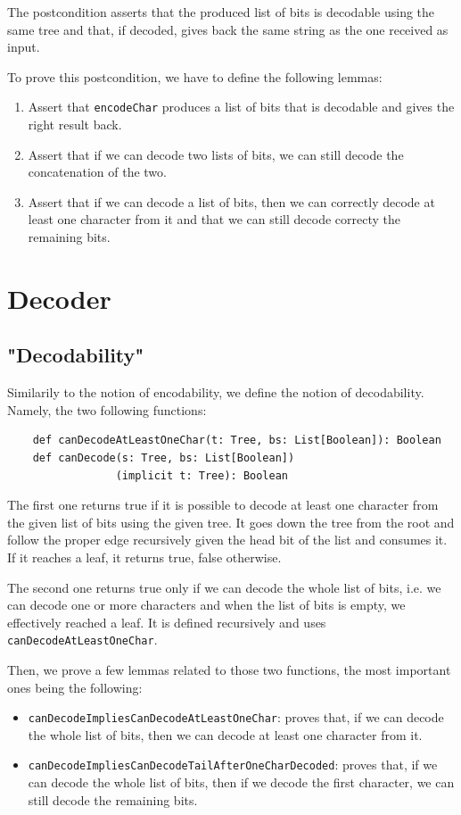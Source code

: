 \documentclass[a4paper,UKenglish,cleveref, autoref, thm-restate]{lipics-v2021}
\begin{document}
The postcondition asserts that the produced list of bits is decodable using the same tree and that, if decoded, gives back the same string as the one received as input.

To prove this postcondition, we have to define the following lemmas:
\begin{enumerate}
    \item Assert that \lstinline{encodeChar} produces a list of bits that is decodable and gives the right result back.
    \item Assert that if we can decode two lists of bits, we can still decode the concatenation of the two.
    \item Assert that if we can decode a list of bits, then we can correctly decode at least one character from it and that we can still decode correcty the remaining bits.
\end{enumerate}

\section{Decoder}

\subsection{"Decodability"}
Similarily to the notion of encodability, we define the notion of decodability. Namely, the two following functions:

\begin{lstlisting}
    def canDecodeAtLeastOneChar(t: Tree, bs: List[Boolean]): Boolean
    def canDecode(s: Tree, bs: List[Boolean])
                 (implicit t: Tree): Boolean
\end{lstlisting}

The first one returns true if it is possible to decode at least one character from the given list of bits using the given tree. 
It goes down the tree from the root and follow the proper edge recursively given the head bit of the list and consumes it. If it reaches a leaf, it returns true, false otherwise.

The second one returns true only if we can decode the whole list of bits, i.e. we can decode one or more characters and when the list of bits is empty, we effectively reached a leaf. It is defined recursively and uses \lstinline{canDecodeAtLeastOneChar}.

Then, we prove a few lemmas related to those two functions, the most important ones being the following:
\begin{itemize}
    \item \lstinline{canDecodeImpliesCanDecodeAtLeastOneChar}: proves that, if we can decode the whole list of bits, then we can decode at least one character from it.
    \item \lstinline{canDecodeImpliesCanDecodeTailAfterOneCharDecoded}: proves that, if we can decode the whole list of bits, then if we decode the first character, we can still decode the remaining bits.
\end{itemize}
\end{document}
